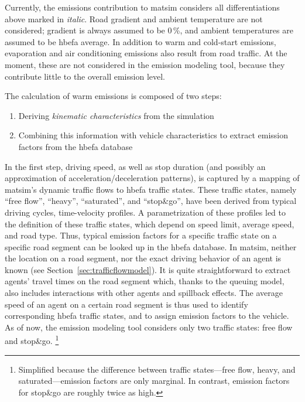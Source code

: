 Currently, the emissions contribution to \gls{matsim} considers all differentiations above marked in \emph{italic}. Road gradient and ambient temperature are not considered; gradient is always assumed to be 0\,\%, and ambient temperatures are assumed to be \gls{hbefa} average.
%
In addition to warm and cold-start emissions, evaporation and air conditioning emissions also result from road traffic. At the moment, these are not considered in the emission modeling tool, because they  contribute little to the overall emission level.

The calculation of warm emissions is composed of two steps:
%
\begin{enumerate}\styleEnumerate
 \item Deriving \emph{kinematic characteristics} from the simulation
 \item Combining this information with vehicle characteristics to 
 extract emission factors from the \gls{hbefa} database
\end{enumerate}
%
In the first step, driving speed, as well as stop duration (and possibly an 
approximation of acceleration/deceleration patterns), is captured by a 
mapping of \gls{matsim}'s dynamic traffic flows to \gls{hbefa} traffic states. 
These traffic states, namely ``free flow'', ``heavy'', ``saturated'', and ``stop\&go'', 
have been derived from typical driving cycles, \ie time-velocity profiles. 
A parametrization of these profiles led to the definition of these traffic 
states, which depend on speed limit, average speed, and road type. Thus, 
typical emission factors for a specific traffic state on a specific road segment 
can be looked up in the \gls{hbefa} database.
%
In \gls{matsim}, neither the location on a road segment, nor the exact driving behavior of an agent is known (see Section~\ref{sec:trafficflowmodel}).
%
%
It is quite straightforward to extract agents' travel times on the road segment which, thanks to the queuing model, also includes interactions with other agents and spillback effects.
%
The average speed of an agent on a certain road segment is thus used to 
identify corresponding \gls{hbefa} traffic states, and to assign emission 
factors to the vehicle. As of now, the emission modeling tool considers only 
two traffic states: free flow and stop\&go.%
% 
\footnote{
%
Simplified because the difference between 
traffic states---free flow, heavy, and saturated---emission factors are 
only marginal. In contrast, emission factors for 
stop\&go are roughly twice as high.
%
}
